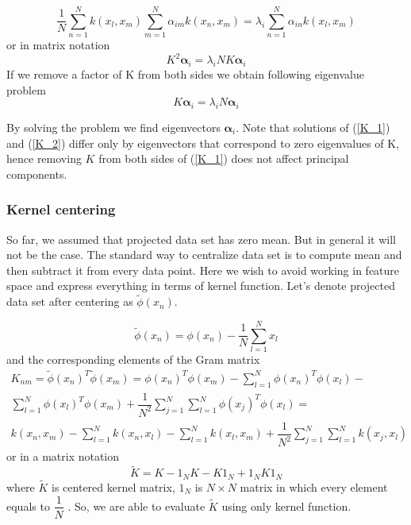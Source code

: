 \begin{equation}
\dfrac{1}{N}\sum_{n=1}^{N}{k(x_l, x_m)} \sum_{m=1}^{N}{\alpha_{im}k(x_n, x_m)} = \lambda_i \sum_{n=1}^{N}{\alpha_{in}k(x_l, x_m)}
\end{equation}
or in matrix notation
\begin{equation}\label{K_1}
K^2 \bm{\alpha}_i = \lambda_i N K \bm{\alpha}_i
\end{equation}
If we remove a factor of K from both sides we obtain following eigenvalue problem
\begin{equation}\label{K_2}
K \bm{\alpha}_i = \lambda_i N \bm{\alpha}_i
\end{equation}

By solving the problem we find eigenvectors $\bm{\alpha}_i$. Note that solutions of (\ref{K_1}) and (\ref{K_2}) differ only by eigenvectors that correspond to zero eigenvalues of K, hence removing $K$ from both sides of (\ref{K_1}) does not affect principal components.  

\subsubsection{Kernel centering}
So far, we assumed that projected data set has zero mean. But in general it will not be the case. The standard way to centralize data set is to compute mean and then subtract it from every data point.
Here we wish to avoid working in feature space and express everything in terms of kernel function. Let's denote projected data set after centering as $\widetilde{\phi}(x_n)$.

\begin{equation}
\widetilde{\phi}(x_n) = \phi(x_n) - \frac{1}{N}\sum_{l=1}^{N} x_l
\end{equation}
and the corresponding elements of the Gram matrix
\begin{equation}
\begin{aligned}
K_{nm} = \widetilde{\phi}(x_n)^T\widetilde{\phi}(x_m) = 
\phi(x_n)^T\phi(x_m) -
\sum_{l=1}^{N}{\phi(x_n)^T\phi(x_l)} - \\ \sum_{l=1}^{N}{\phi(x_l)^T\phi(x_m)} +  \dfrac{1}{N^2}\sum_{j=1}^{N}\sum_{l=1}^{N}{\phi(x_j)^T\phi(x_l)} = \\
k(x_n, x_m) - \sum_{l=1}^{N}{k(x_n, x_l)} - \sum_{l=1}^{N}{k(x_l, x_m)} + \dfrac{1}{N^2}\sum_{j=1}^{N}\sum_{l=1}^{N}{k(x_j, x_l)}
\end{aligned}
\end{equation}
or in a matrix notation
\begin{equation}
\widetilde{K} = K - 1_NK - K1_N + 1_NK1_N
\end{equation}
where $\widetilde{K}$ is centered kernel matrix, $1_N$ is $N \times N$ matrix in which every element equals to $\dfrac{1}{N}$ \citep{bishop}.
So, we are able to evaluate $\widetilde{K}$ using only kernel function.
